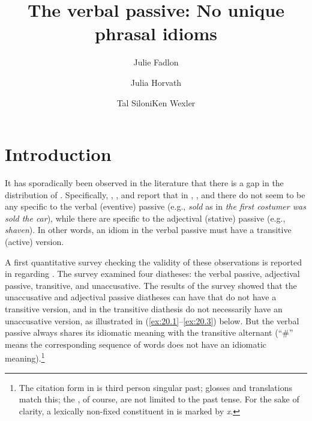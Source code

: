 \documentclass[output=paper]{langsci/langscibook}
\author{Julie Fadlon\affiliation{Tel Aviv University}\and Julia Horvath\affiliation{Tel Aviv University}\and Tal Siloni\affiliation{Tel Aviv University}\lastand Ken Wexler\affiliation{Massachusetts Institute of Technology}}
\title{The verbal passive: No unique phrasal idioms}
\begin{document}
\glsresetall
\maketitle\newpage

\section{Introduction}

It has sporadically been observed in the literature that there is a gap in the
distribution of . Specifically, \citet{DubSim1996}, \citet{Marantz1997},
and \textcite{Ruwet1991} report that in , , and
 there do not seem to be any  specific to
the verbal (eventive) passive (e.g., \emph{sold} as in \textit{the first costumer was
sold the car}), while there are  specific to the adjectival (stative)
passive (e.g., \emph{shaven}). In other words, an idiom in the verbal passive
must have a transitive (active) version.

A first quantitative survey checking the validity of these observations is
reported in \citet{HorSil2009} regarding . The survey examined four
diatheses: the verbal passive, adjectival passive, transitive, and
unaccusative. The results of the survey showed that the unaccusative and
adjectival passive diatheses can have  that do not have a transitive
version, and  in the transitive diathesis do not necessarily have an
unaccusative version, as illustrated in (\ref{ex:20.1}--\ref{ex:20.3}) below. But the verbal passive
always shares its idiomatic meaning with the transitive alternant (``\#'' means the
corresponding sequence of words does not have an idiomatic
meaning).\footnote{The citation form in  is third person singular
    past; glosses and translations match this; the , of course, are not
    limited to the past tense. For the sake of clarity, a lexically non-fixed
    constituent in   is marked by \emph{x}.}
\end{document}
